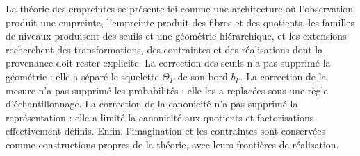 \documentclass[11pt,a4paper,openany]{book}
\begin{document}
La théorie des empreintes se présente ici comme une architecture où l'observation produit une empreinte, l'empreinte produit des fibres et des quotients, les familles de niveaux produisent des seuils et une géométrie hiérarchique, et les extensions recherchent des transformations, des contraintes et des réalisations dont la provenance doit rester explicite. La correction des seuils n'a pas supprimé la géométrie : elle a séparé le squelette $\Theta_P$ de son bord $b_P$. La correction de la mesure n'a pas supprimé les probabilités : elle les a replacées sous une règle d'échantillonnage. La correction de la canonicité n'a pas supprimé la représentation : elle a limité la canonicité aux quotients et factorisations effectivement définis. Enfin, l'imagination et les contraintes sont conservées comme constructions propres de la théorie, avec leurs frontières de réalisation.
\end{document}
